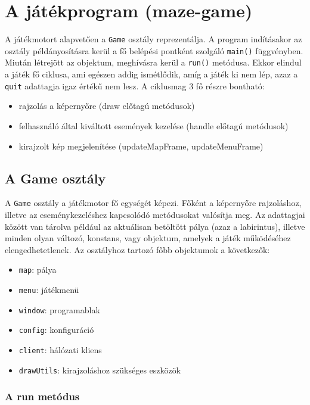 \section{A játékprogram (maze-game)}

A játékmotort alapvetően a \verb|Game| osztály reprezentálja. A program indításakor az osztály példányosításra kerül a fő belépési pontként szolgáló \verb|main()| függvényben. Miután létrejött az objektum, meghívásra kerül a \verb|run()| metódusa. Ekkor elindul a játék fő ciklusa, ami egészen addig ismétlődik, amíg a játék ki nem lép, azaz a \verb|quit| adattagja igaz értékű nem lesz. A ciklusmag 3 fő részre bontható:

\begin{itemize}
	\item rajzolás a képernyőre (draw előtagú metódusok)
	\item felhasználó által kiváltott események kezelése (handle előtagú metódusok)
	\item kirajzolt kép megjelenítése (updateMapFrame, updateMenuFrame)
\end{itemize}

\subsection{A Game osztály}

A \verb|Game| osztály a játékmotor fő egységét képezi. Főként a képernyőre rajzoláshoz, illetve az eseménykezeléshez kapcsolódó metódusokat valósítja meg. Az adattagjai között van tárolva például az aktuálisan betöltött pálya (azaz a labirintus), illetve minden olyan változó, konstans, vagy objektum, amelyek a játék működéséhez elengedhetetlenek. Az osztályhoz tartozó főbb objektumok a következők:

\begin{itemize}
	\item \verb|map|: pálya
	\item \verb|menu|: játékmenü
	\item \verb|window|: programablak
	\item \verb|config|: konfiguráció
	\item \verb|client|: hálózati kliens
	\item \verb|drawUtils|: kirajzoláshoz szükséges eszközök
\end{itemize}

\subsubsection{A run metódus}

